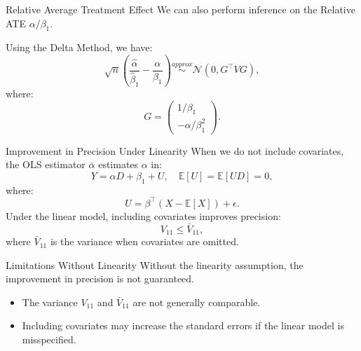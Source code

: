 \documentclass[xcolor=svgnames,t]{beamer}
\begin{document}
    \begin{frame}{Relative Average Treatment Effect}
    We can also perform inference on the Relative ATE $\alpha / \beta_1$.
    
    Using the Delta Method, we have:
    \[
    \sqrt{n} \left( \frac{\hat{\alpha}}{\hat{\beta}_1} - \frac{\alpha}{\beta_1} \right) \overset{approx}{\sim} \mathcal{N}\left( 0, G^\top V G \right),
    \]
    where:
    \[
    G = \begin{pmatrix}
    1 / \beta_1 \\
    - \alpha / \beta_1^2
    \end{pmatrix}.
    \]
    
    \vspace{1cm} %
    
    \end{frame}
    
    \begin{frame}{Improvement in Precision Under Linearity}
    When we do not include covariates, the OLS estimator $\bar{\alpha}$ estimates $\alpha$ in:
    \[
    Y = \alpha D + \beta_1 + U, \quad \mathbb{E}[U] = \mathbb{E}[U D] = 0,
    \]
    where:
    \[
    U = \beta^\top (X - \mathbb{E}[X]) + \epsilon.
    \]
    Under the linear model, including covariates improves precision:
    \[
    V_{11} \leq \bar{V}_{11},
    \]
    where $\bar{V}_{11}$ is the variance when covariates are omitted.
    
    \vspace{1cm} %
    
    \end{frame}
    
    \begin{frame}{Limitations Without Linearity}
    Without the linearity assumption, the improvement in precision is not guaranteed.
    
    \begin{itemize}
        \item The variance $V_{11}$ and $\bar{V}_{11}$ are not generally comparable.
        \item Including covariates may increase the standard errors if the linear model is misspecified.
    \end{itemize}
    
    \vspace{1cm} %
    
    \end{frame}
    
\end{document}
